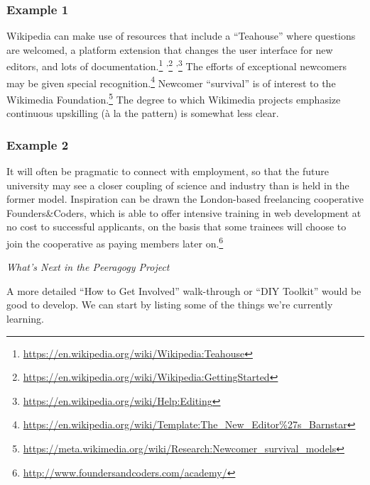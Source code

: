 \subsubsection*{Example 1} Wikipedia  can make use of resources that
include a ``Teahouse'' where questions are welcomed, a platform extension that changes the user
interface for new editors, and lots of documentation.\footnote{\url{https://en.wikipedia.org/wiki/Wikipedia:Teahouse}}%
\textsuperscript{,}\footnote{\url{https://en.wikipedia.org/wiki/Wikipedia:GettingStarted}}%
\textsuperscript{,}\footnote{\url{https://en.wikipedia.org/wiki/Help:Editing}}
The efforts of exceptional newcomers may be given special
recognition.\footnote{\url{https://en.wikipedia.org/wiki/Template:The_New_Editor\%27s_Barnstar}}
Newcomer ``survival'' is of interest to the Wikimedia
Foundation.\footnote{\url{https://meta.wikimedia.org/wiki/Research:Newcomer_survival_models}}
The degree to which Wikimedia projects emphasize continuous upskilling
(\`a la the  pattern) is somewhat less clear.

\subsubsection*{Example 2} It will often be pragmatic to connect
 with employment, so that the future
university may see a closer coupling of science and industry than is
held in the former model.  Inspiration can be drawn the London-based freelancing cooperative Founders\&Coders, which is
able to offer intensive training in web development at no cost to
successful applicants, on the basis that some trainees will choose to
join the cooperative as paying members later
on.\footnote{\url{http://www.foundersandcoders.com/academy/}}


\begin{framed}
\noindent 
\emph{What's Next in the Peeragogy Project}
\begin{collectinmacro}{\NewcomerWN}{}{}
A more detailed ``How to Get Involved'' walk-through or ``DIY Toolkit'' would be good to develop. We can start by listing some of the things we're currently learning.
\end{collectinmacro}
\NewcomerWN
\end{framed}

\newpage
